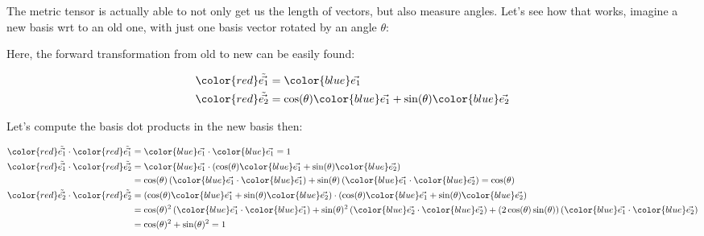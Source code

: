 The metric tensor is actually able to not only get us the length of vectors, but also measure angles.
Let's see how that works, imagine a new basis wrt to an old one, with just one basis vector rotated by an angle $\theta$:

\begin{center}

\end{center}

Here, the forward transformation from old to new can be easily found:

\begin{align*}
    \begingroup\color{red}\tilde{\vec{e_1}}\endgroup &= \begingroup\color{blue}\vec{e_1}\endgroup\\
    \begingroup\color{red}\tilde{\vec{e_2}}\endgroup &= \cos(\theta)\begingroup\color{blue}\vec{e_1}\endgroup + \sin(\theta)\begingroup\color{blue}\vec{e_2}\endgroup
\end{align*}

Let's compute the basis dot products in the new basis then:

\begin{align*}
    \begingroup\color{red}\tilde{\vec{e_1}}\endgroup \cdot \begingroup\color{red}\tilde{\vec{e_1}}\endgroup &= \begingroup\color{blue}\vec{e_1}\endgroup \cdot \begingroup\color{blue}\vec{e_1}\endgroup = 1\\
    \begingroup\color{red}\tilde{\vec{e_1}}\endgroup \cdot \begingroup\color{red}\tilde{\vec{e_2}}\endgroup &= \begingroup\color{blue}\vec{e_1}\endgroup \cdot \left(\cos(\theta)\begingroup\color{blue}\vec{e_1}\endgroup + \sin(\theta)\begingroup\color{blue}\vec{e_2}\endgroup\right)\\
    &= \cos(\theta)\left(\begingroup\color{blue}\vec{e_1}\endgroup \cdot \begingroup\color{blue}\vec{e_1}\endgroup\right) + \sin(\theta) \left(\begingroup\color{blue}\vec{e_1}\endgroup \cdot \begingroup\color{blue}\vec{e_2}\endgroup\right)
    = \cos(\theta)\\
    \begingroup\color{red}\tilde{\vec{e_2}}\endgroup \cdot \begingroup\color{red}\tilde{\vec{e_2}}\endgroup 
    &= \left(\cos(\theta)\begingroup\color{blue}\vec{e_1}\endgroup + \sin(\theta)\begingroup\color{blue}\vec{e_2}\endgroup\right) \cdot \left(\cos(\theta)\begingroup\color{blue}\vec{e_1}\endgroup + \sin(\theta)\begingroup\color{blue}\vec{e_2}\endgroup\right)\\
    &= \cos(\theta)^2 \left(\begingroup\color{blue}\vec{e_1}\endgroup \cdot \begingroup\color{blue}\vec{e_1}\endgroup\right) + \sin(\theta)^2 \left(\begingroup\color{blue}\vec{e_2}\endgroup \cdot \begingroup\color{blue}\vec{e_2}\endgroup\right) + \left(2\cos(\theta)\sin(\theta)\right)
    \left(\begingroup\color{blue}\vec{e_1}\endgroup \cdot \begingroup\color{blue}\vec{e_2}\endgroup\right)\\
    &= \cos(\theta)^2 + \sin(\theta)^2 = 1
\end{align*}

